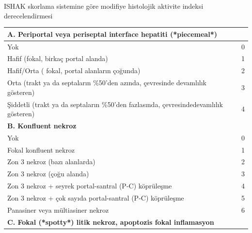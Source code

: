 \begin{minipage}[c]{\textwidth}
\renewcommand{\arraystretch}{1.1} %
\centering
\begin{threeparttable}
\caption[ISHAK skorlama sistemine göre modifiye
histolojik aktivite indeksi derecelendirmesi]{ISHAK skorlama sistemine göre modifiye
histolojik aktivite indeksi derecelendirmesi} \label{tablo:ishakhai} %
{\scriptsize \begin{tabular}{ll}
\toprule\toprule
\textbf{A. Periportal veya periseptal interface hepatiti (*piecemeal*)}              &   \\
\midrule
Yok                                                                                  & 0 \\
Hafif (fokal, birkaç portal alanda)                                                  & 1 \\
Hafif/Orta ( fokal, portal alanların çoğunda)                                        & 2 \\
Orta (trakt ya da septaların \%50’den azında, çevresinde devamlılık gösteren)        & 3 \\
Şiddetli (trakt ya da septaların \%50’den fazlasında, çevresindedevamlılık gösteren) & 4 \\
\midrule
\textbf{B. Konfluent nekroz}                                                         &   \\
\midrule
Yok                                                                                  & 0 \\
Fokal konfluent nekroz                                                               & 1 \\
Zon 3 nekroz (bazı alanlarda)                                                        & 2 \\
Zon 3 nekroz (çoğu alanda)                                                           & 3 \\
Zon 3 nekroz + seyrek portal-santral (P-C) köprüleşme                                & 4 \\
Zon 3 nekroz + çok sayıda portal-santral (P-C) köprüleşme                            & 5 \\
Panasiner veya mültiasiner nekroz                                                    & 6 \\
\midrule
\textbf{C. Fokal (*spotty*) litik nekroz, apoptozis fokal inflamasyon}               &   \\

\end{tabular}}
\end{threeparttable}
\end{minipage}
